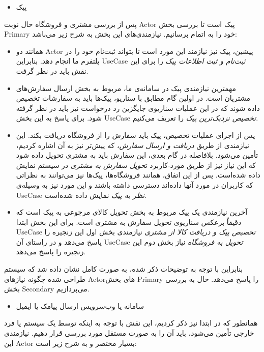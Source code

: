 \documentclass[]{article}
\begin{document}
\begin{itemize}
\item
  پیک
\end{itemize}

پس از بررسی مشتری و فروشگاه حال نوبت Actor پیک است تا بررسی بخش Primary
خود را به اتمام برسانیم. نیازمندی‌های این بخش به شرح زیر می‌باشد:

\begin{itemize}
\item
  همانند دو Actor پیشین، پیک نیز نیازمند این مورد است تا بتواند ثبت‌نام
  خود را در پلتفرم ما انجام دهد. بنابراین UseCase \emph{ثبت‌نام و ثبت
  اطلاعات پیک} را برای این نقش باید در نظر گرفت.
\item
  مهمترین نیازمندی پیک در سامانه‌ی ما، مربوط به بخش ارسال سفارش‌های
  مشتریان است. در اولین گام مطابق با سناریو، پیک‌ها باید به سفارشات
  تخصیص داده شوند که در این عملیات سناریو‌ی جایگزین رد درخواست نیز باید
  در نظر گرفته شود. برای پاسخ به این بخش UseCase \emph{تخصیص نزدیک‌‌ترین
  پیک} را تعریف می‌کنیم.
\item
  پس از اجرای عملیات تخصیص، پیک باید سفارش را از فروشگاه دریافت بکند.
  این نیازمندی از طریق \emph{دریافت و ارسال سفارش}، که پیش‌تر نیز به آن
  اشاره کردیم، تأمین می‌شود. بلافاصله در گام بعدی، این سفارش باید به
  مشتری تحویل داده شود که این نیاز نیز از طریق مورد-کاربرد ت\emph{حویل
  سفارش به مشتری} در سیستم نمایش داده شده‌است. پس از این اتفاق، همانند
  فروشگاه‌ها، پیک‌ها نیز می‌توانند به نظراتی که کاربران در مورد آنها
  داده‌اند دسترسی داشته باشند و این مورد نیز به وسیله‌ی UseCase
  \emph{نظر به پیک} نمایش داده شده‌است.
\item
  آخرین نیازمندی یک پیک مربوط به بخش تحویل کالای مرجوعی به پیک است که
  دقیقاً برعکس سناریوی تحویل سفارش به مشتری است. برای این بخش ابتدا
  UseCase \emph{تخصیص پیک و دریافت کالا از مشتری} نیازمندی بخش اول این
  زنجیره را پاسخ می‌دهد و در راستای آن UseCase \emph{تحویل به فروشگاه}
  نیاز بخش دوم این زنجیره را پاسخ می‌دهد.
\end{itemize}

بنابراین با توجه به توضیحات ذکر شده، به صورت کامل نشان داده شد که سیستم
طراحی شده چگونه نیازهای Actorهای بخش Primary را پاسخ می‌دهد. حال به
بررسی بخش Secondary می‌پردازیم.

\begin{itemize}
\item
  سامانه یا وب‌سرویس ارسال پیامک یا ایمیل
\end{itemize}

همانطور که در ابتدا نیز ذکر کردیم، این نقش با توجه به اینکه توسط یک
سیستم یا فرد خارجی تأمین می‌شود، باید آن را به صورت مستقل مورد بررسی
قرار دهیم. نیازمندی این Actor بسیار مختصر و به شرح زیر است:
\end{document}
